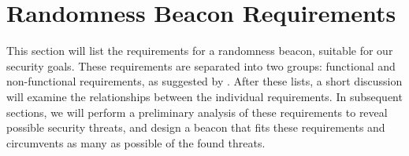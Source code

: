 \section{Randomness Beacon Requirements}
\label{sec:beacon_requirements}

This section will list the requirements for a randomness beacon, suitable for our security goals.
These requirements are separated into two groups: functional and non-functional requirements, as suggested by \citet[sec.\ 1.4.1]{swebok}.
After these lists, a short discussion will examine the relationships between the individual requirements.
In subsequent sections, we will perform a preliminary analysis of these requirements to reveal possible security threats, and design a beacon that fits these requirements and circumvents as many as possible of the found threats.

